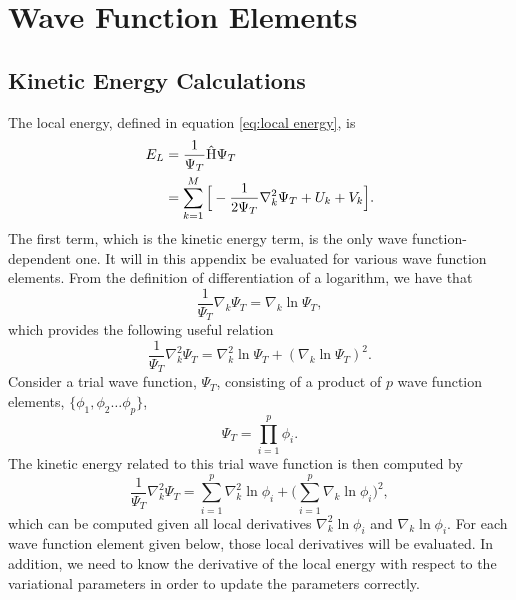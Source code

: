 \chapter{Wave Function Elements} \label{chp:appendixe}

\section{Kinetic Energy Calculations}
The local energy, defined in equation \eqref{eq:local energy}, is
\begin{align}
E_L &=\frac{1}{\Psi_T}\hat{\text{H}}\Psi_T\\
&=\sum_{k=1}^M\Big[-\frac{1}{2\Psi_T}\nabla_k^2\Psi_T + U_k + V_k\Big].
\end{align}
The first term, which is the kinetic energy term, is the only wave function-dependent one. It will in this appendix be evaluated for various wave function elements. From the definition of differentiation of a logarithm, we have that
\begin{equation}
\frac{1}{\Psi_T}\nabla_k\Psi_T=\nabla_k\ln\Psi_T,
\end{equation}
which provides the following useful relation 
\begin{equation}
\frac{1}{\Psi_T}\nabla_k^2\Psi_T=\nabla_k^2\ln\Psi_T + (\nabla_k\ln\Psi_T)^2.
\end{equation}
Consider a trial wave function, $\Psi_T$, consisting of a product of $p$ wave function elements, $\{\phi_1, \phi_2\hdots\phi_p\}$,
\begin{equation}
\Psi_T = \prod_{i=1}^p\phi_i.
\end{equation}
The kinetic energy related to this trial wave function is then computed by
\begin{equation}
\frac{1}{\Psi_T}\nabla_k^2\Psi_T=\sum_{i=1}^p\nabla_k^2\ln\phi_i + \Big(\sum_{i=1}^p\nabla_k\ln\phi_i\Big)^2,
\end{equation}
which can be computed given all local derivatives $\nabla_k^2\ln\phi_i$ and $\nabla_k\ln\phi_i$. For each wave function element given below, those local derivatives will be evaluated. In addition, we need to know the derivative of the local energy with respect to the variational parameters in order to update the parameters correctly. 

